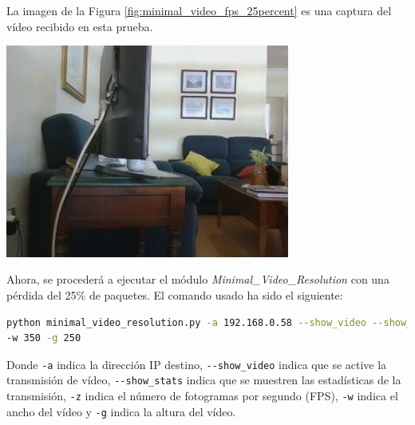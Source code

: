 \newpage
La imagen de la Figura \ref{fig:minimal_video_fps_25percent} es una captura del vídeo recibido en esta prueba.
\begin{center}
  \includegraphics[width = 0.7\textwidth]{images/VideoRecibido8.2.png}
  \label{fig:minimal_video_fps_25percent}
\end{center}

\newpage


Ahora, se procederá a ejecutar el módulo \textit{Minimal\_Video\_Resolution} con una pérdida del 25\% de paquetes. El comando usado ha sido el siguiente:

\begin{lstlisting}[language=bash,basicstyle=\ttfamily\scriptsize]
python minimal_video_resolution.py -a 192.168.0.58 --show_video --show_stats -z 12 \\
-w 350 -g 250
\end{lstlisting}
Donde \verb|-a| indica la dirección IP destino, \verb|--show_video| indica que se active la transmisión de vídeo, \verb|--show_stats| indica que se muestren las estadísticas de la transmisión, \verb|-z| indica el número de fotogramas por segundo (FPS), \verb|-w| indica el ancho del vídeo y \verb|-g| indica la altura del vídeo.
\vspace{\baselineskip}

